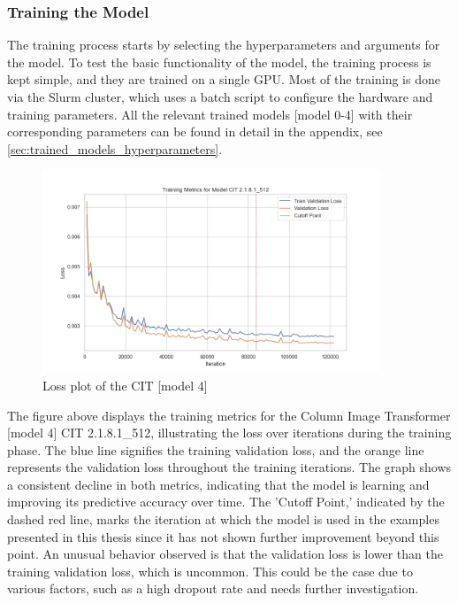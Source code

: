     \subsubsection{Training the Model}

    The training process starts by selecting the hyperparameters and arguments for the model. To test the basic functionality of the model, the training process is kept simple, and they are trained on a single GPU. Most of the training is done via the Slurm cluster, which uses a batch script to configure the hardware and training parameters. All the relevant trained models [model 0-4] with their corresponding parameters can be found in detail in the appendix, see \autoref{sec:trained_models_hyperparameters}.
    
    \begin{figure}[H]
        \centering
        \includegraphics[width=0.9\textwidth]{imgs/Training_Metrics_CIT 2.1.8.1_512.png}
        \caption{Loss plot of the CIT [model 4]}
        \label{fig:Training_Metrics_CIT512}
    \end{figure}

    The figure above displays the training metrics for the Column Image Transformer [model 4] CIT 2.1.8.1\_512, illustrating the loss over iterations during the training phase. The blue line signifies the training validation loss, and the orange line represents the validation loss throughout the training iterations. The graph shows a consistent decline in both metrics, indicating that the model is learning and improving its predictive accuracy over time. The 'Cutoff Point,' indicated by the dashed red line, marks the iteration at which the model is used in the examples presented in this thesis since it has not shown further improvement beyond this point. An unusual behavior observed is that the validation loss is lower than the training validation loss, which is uncommon. This could be the case due to various factors, such as a high dropout rate and needs further investigation.

